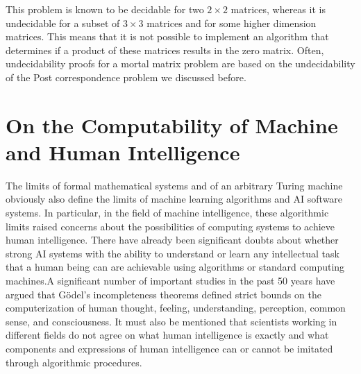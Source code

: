 This problem is known to be decidable for two $2 \times 2$ matrices, whereas it is undecidable for a subset of $3 \times 3$ matrices and for some higher dimension matrices. This means that it is not possible to implement an algorithm that determines if a product of these matrices results in the zero matrix. Often, undecidability proofs for a mortal matrix problem are based on the undecidability of the Post correspondence problem we discussed before.

\section{\label{sec:11.3}On the Computability of Machine and Human Intelligence}

The limits of formal mathematical systems and of an arbitrary Turing machine obviously also define the limits of machine learning algorithms and AI software systems. In particular, in the field of machine intelligence, these algorithmic limits raised concerns about the possibilities of computing systems to achieve human intelligence. There have already been significant doubts about whether strong AI systems with the ability to understand or learn any intellectual task that a human being can are achievable using algorithms or standard computing machines.\break A significant number of important studies in the past 50 years have argued that G\"{o}del's incompleteness theorems defined strict bounds on the computerization of human thought, feeling, understanding, perception, common sense, and consciousness. It must also be mentioned that scientists working in different fields do not agree on what human intelligence is exactly and what components and expressions of human intelligence can or cannot be imitated through algorithmic procedures.


